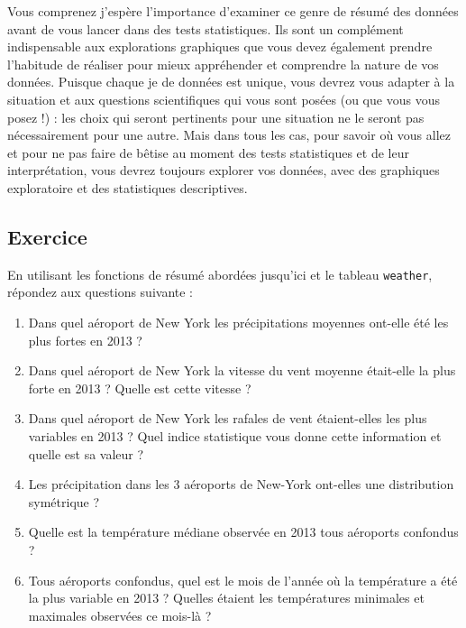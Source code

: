 \documentclass[
  a4paper,
  DIV=11,
  numbers=noendperiod,
  oneside]{scrreprt}
\providecommand{\tightlist}{%
  \setlength{\itemsep}{0pt}\setlength{\parskip}{0pt}}\usepackage{longtable,booktabs,array}
\begin{document}
\begin{tcolorbox}[enhanced jigsaw, toprule=.15mm, coltitle=black, colframe=quarto-callout-note-color-frame, titlerule=0mm, leftrule=.75mm, opacityback=0, bottomrule=.15mm, title=\textcolor{quarto-callout-note-color}{\faInfo}\hspace{0.5em}{Note}, colbacktitle=quarto-callout-note-color!10!white, breakable, colback=white, left=2mm, toptitle=1mm, arc=.35mm, bottomtitle=1mm, rightrule=.15mm, opacitybacktitle=0.6]
Vous comprenez j'espère l'importance d'examiner ce genre de résumé des
données avant de vous lancer dans des tests statistiques. Ils sont un
complément indispensable aux explorations graphiques que vous devez
également prendre l'habitude de réaliser pour mieux appréhender et
comprendre la nature de vos données. Puisque chaque je de données est
unique, vous devrez vous adapter à la situation et aux questions
scientifiques qui vous sont posées (ou que vous vous posez !) : les
choix qui seront pertinents pour une situation ne le seront pas
nécessairement pour une autre. Mais dans tous les cas, pour savoir où
vous allez et pour ne pas faire de bêtise au moment des tests
statistiques et de leur interprétation, vous devrez toujours explorer
vos données, avec des graphiques exploratoire et des statistiques
descriptives.
\end{tcolorbox}

\hypertarget{exercice}{%
\subsection{Exercice}\label{exercice}}

En utilisant les fonctions de résumé abordées jusqu'ici et le tableau
\texttt{weather}, répondez aux questions suivante :

\begin{enumerate}
\def\labelenumi{\arabic{enumi}.}
\tightlist
\item
  Dans quel aéroport de New York les précipitations moyennes ont-elle
  été les plus fortes en 2013 ?
\item
  Dans quel aéroport de New York la vitesse du vent moyenne était-elle
  la plus forte en 2013 ? Quelle est cette vitesse ?
\item
  Dans quel aéroport de New York les rafales de vent étaient-elles les
  plus variables en 2013 ? Quel indice statistique vous donne cette
  information et quelle est sa valeur ?
\item
  Les précipitation dans les 3 aéroports de New-York ont-elles une
  distribution symétrique ?
\item
  Quelle est la température médiane observée en 2013 tous aéroports
  confondus ?
\item
  Tous aéroports confondus, quel est le mois de l'année où la
  température a été la plus variable en 2013 ? Quelles étaient les
  températures minimales et maximales observées ce mois-là ?
\end{enumerate}
\end{document}
